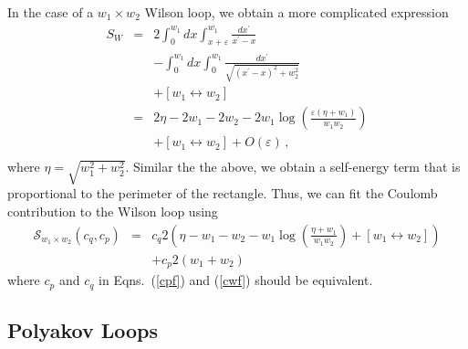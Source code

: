 \documentclass[preprint,aps,prd]{revtex4-2}
\begin{document}
In the case of a $w_1\times w_2$ Wilson loop, we obtain
a more complicated expression
%
\begin{eqnarray}
  S_W &=& 2 \int_0^{w_1} dx \int_{x+\varepsilon}^{w_1} \frac{dx^\prime}{x^\prime-x}
               \nonumber\\
               & &  - \int_0^{w_1} dx \int_{0}^{w_1} \frac{dx^\prime}{
                 \sqrt{(x^\prime-x)^2+ w_2^2}}
               \nonumber\\
               & &  +\left[w_1 \leftrightarrow w_2 \right]\\
   &=&  2 \eta - 2 w_1 -2 w_2
               - 2 w_1 \log\left(\frac{\varepsilon\left(\eta +w_1\right)}{
                 w_1 w_2}\right)
               \nonumber\\
   & &  +\left[w_1 \leftrightarrow w_2\right] + O(\varepsilon) \, ,\\
\end{eqnarray}
where $\eta=\sqrt{w_1^2+w_2^2}$.  Similar the the above, 
we obtain a self-energy term that is proportional to the perimeter of
the rectangle.  Thus, we can fit the Coulomb
contribution to the Wilson loop using
%
\begin{eqnarray}
  \mathcal{S}_{w_1\times w_2}\left(c_q, c_p\right) & = &
     c_q 2 \left(\eta
        -  w_1 - w_2
        -  w_1 \log\left(\frac{\eta +w_1}{w_1 w_2}\right)
        + \left[w_1 \leftrightarrow w_2\right]\right)
        \nonumber\\ 
 &&  + c_p  2\left(w_1+w_2\right)  \label{cwf}
\end{eqnarray}
%
where $c_p$ and $c_q$ in Eqns.~(\ref{cpf}) and (\ref{cwf})
should be equivalent.

\subsection{Polyakov Loops}
\end{document}
